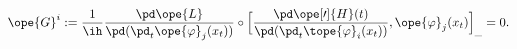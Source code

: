 \begin{equation}	\label{12.66}
\ope{G}^i :=
\frac{1}{\ih}
\frac{\pd\ope{L}}{\pd(\pd_t\ope{\varphi}_j(x_t) )} \circ
\Bigl[
\frac{\pd\ope[\prime]{H}(t)}{\pd(\pd_t\tope{\varphi}_i(x_t) )}
,
\ope{\varphi}_j(x_t)
\Bigr]_{\_}
= 0 .
	\end{equation}

